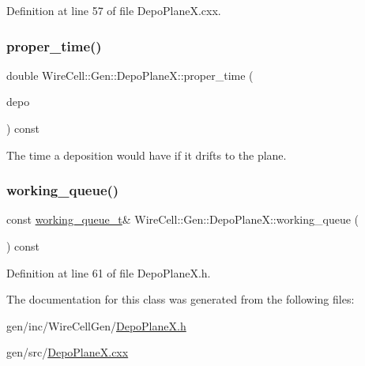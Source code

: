 Definition at line 57 of file Depo\+Plane\+X.\+cxx.

\mbox{\label{class_wire_cell_1_1_gen_1_1_depo_plane_x_aa5929aed1786b27d74603a7b92aecb78}} 
\subsubsection{\texorpdfstring{proper\+\_\+time()}{proper\_time()}}
{\footnotesize\ttfamily double Wire\+Cell\+::\+Gen\+::\+Depo\+Plane\+X\+::proper\+\_\+time (\begin{DoxyParamCaption}\item[{\hyperlink{class_wire_cell_1_1_i_data_aff870b3ae8333cf9265941eef62498bc}{I\+Depo\+::pointer}}]{depo }\end{DoxyParamCaption}) const}



The time a deposition would have if it drifts to the plane. 

\mbox{\label{class_wire_cell_1_1_gen_1_1_depo_plane_x_a599119cba4e43cde20f055b64a0139f0}} 
\subsubsection{\texorpdfstring{working\+\_\+queue()}{working\_queue()}}
{\footnotesize\ttfamily const \hyperlink{class_wire_cell_1_1_gen_1_1_depo_plane_x_ade1129aabbdd7bc1d4e880169d715a19}{working\+\_\+queue\+\_\+t}\& Wire\+Cell\+::\+Gen\+::\+Depo\+Plane\+X\+::working\+\_\+queue (\begin{DoxyParamCaption}{ }\end{DoxyParamCaption}) const\hspace{0.3cm}{\ttfamily [inline]}}



Definition at line 61 of file Depo\+Plane\+X.\+h.



The documentation for this class was generated from the following files\+:\begin{DoxyCompactItemize}
\item 
gen/inc/\+Wire\+Cell\+Gen/\hyperlink{_depo_plane_x_8h}{Depo\+Plane\+X.\+h}\item 
gen/src/\hyperlink{_depo_plane_x_8cxx}{Depo\+Plane\+X.\+cxx}\end{DoxyCompactItemize}
